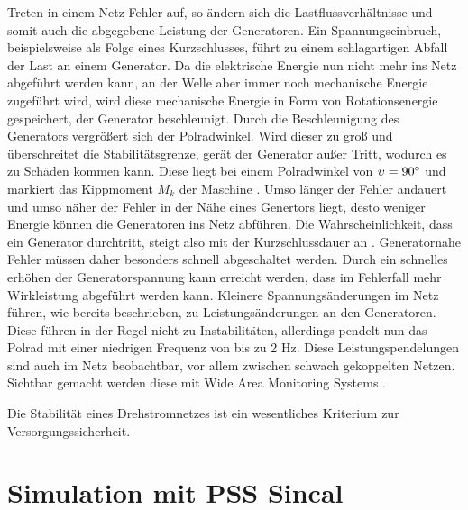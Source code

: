 \documentclass{scrartcl}
\begin{document}
\begin{onehalfspace}
Treten in einem Netz Fehler auf, so ändern sich die Lastflussverhältnisse und somit auch die abgegebene Leistung der Generatoren. Ein Spannungseinbruch, beispielsweise als Folge eines Kurzschlusses, führt zu einem schlagartigen Abfall der Last an einem Generator. Da die elektrische Energie nun nicht mehr ins Netz abgeführt werden kann, an der Welle aber immer noch mechanische Energie zugeführt wird, wird diese mechanische Energie in Form von Rotationsenergie gespeichert, der Generator beschleunigt. Durch die Beschleunigung des Generators vergrößert sich der Polradwinkel. Wird dieser zu groß und überschreitet die Stabilitätsgrenze, gerät der Generator \glqq außer Tritt\grqq, wodurch es zu Schäden kommen kann. Diese liegt bei einem Polradwinkel von $\upsilon = 90\degree$ und markiert das Kippmoment $M_k$ der Maschine \cite[S.187]{Heuck2007}. Umso länger der Fehler andauert und umso näher der Fehler in der Nähe eines Genertors liegt, desto weniger Energie können die Generatoren ins Netz abführen. Die Wahrscheinlichkeit, dass ein Generator \glqq durchtritt\grqq, steigt also mit der Kurzschlussdauer an \cite[S. 56]{Nelles2009}. Generatornahe Fehler müssen daher besonders schnell abgeschaltet werden. Durch ein schnelles erhöhen der Generatorspannung kann erreicht werden, dass im Fehlerfall mehr Wirkleistung abgeführt werden kann. Kleinere Spannungsänderungen im Netz führen, wie bereits beschrieben, zu Leistungsänderungen an den Generatoren. Diese führen in der Regel nicht zu Instabilitäten, allerdings pendelt nun das Polrad mit einer niedrigen Frequenz von bis zu 2 Hz. Diese Leistungspendelungen sind auch im Netz beobachtbar, vor allem zwischen schwach gekoppelten Netzen. Sichtbar gemacht werden diese mit Wide Area Monitoring Systems \cite{wams-swissgrid}.

Die Stabilität eines Drehstromnetzes ist ein wesentliches Kriterium zur Versorgungssicherheit.



\section{Simulation mit PSS Sincal}



\end{onehalfspace}
\end{document}
